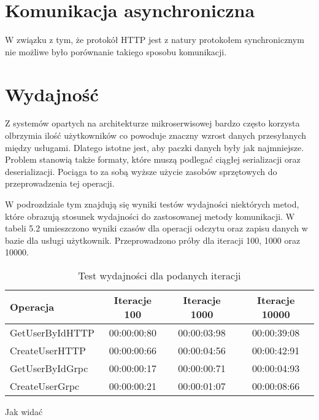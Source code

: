 \section{Komunikacja asynchroniczna}
\par W związku z tym, że protokół HTTP jest z natury protokołem synchronicznym nie możliwe było porównanie takiego sposobu komunikacji.
\section{Wydajność}
\par Z systemów opartych na architekturze mikroserwisowej bardzo często korzysta olbrzymia ilość użytkowników co powoduje znaczny wzrost danych przesyłanych między usługami. Dlatego istotne jest, aby paczki danych były jak najmniejsze. Problem stanowią także formaty, które muszą podlegać ciągłej serializacji oraz deserializacji. Pociąga to za sobą wyższe użycie zasobów sprzętowych do przeprowadzenia tej operacji.
\par W podrozdziale tym znajdują się wyniki testów wydajności niektórych metod, które obrazują stosunek wydajności do zastosowanej metody komunikacji. W tabeli 5.2 umieszczono wyniki czasów dla operacji odczytu oraz zapisu danych w bazie dla usługi użytkownik. Przeprowadzono próby dla iteracji 100, 1000 oraz 10000.
\begin{table}[h!]
    \begin{center}
        \caption{Test wydajności dla podanych iteracji}
        \hspace*{-1cm}
        \begin{tabular}{||M|c|c|c||}
            \toprule
            \textbf{Operacja} & \textbf{Iteracje 100} & \textbf{Iteracje 1000} & \textbf{Iteracje 10000} \\
            \midrule
            GetUserByIdHTTP   & 00:00:00:80           & 00:00:03:98            & 00:00:39:08             \\
            \midrule
            CreateUserHTTP    & 00:00:00:66           & 00:00:04:56            & 00:00:42:91             \\
            \midrule
            GetUserByIdGrpc   & 00:00:00:17           & 00:00:00:71            & 00:00:04:93             \\
            \midrule
            CreateUserGrpc    & 00:00:00:21           & 00:00:01:07            & 00:00:08:66             \\
            \midrule
            \bottomrule
        \end{tabular}
        \hspace*{-1cm}
    \end{center}
\end{table}
Jak widać